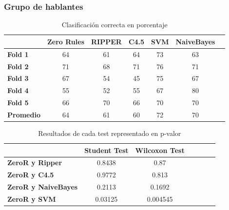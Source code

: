 \documentclass[mathserif]{beamer}%
\begin{document}
\begin{frame}
	\frametitle{Grupo de hablantes}
	
	\begin{table}[H]
		\centering
		\resizebox{9cm}{!} {
		\begin{tabular}{|l|c|c|c|c|c|c|}
			\hline
			\textbf{}  & \textbf{Zero Rules} & \textbf{RIPPER} & \textbf{C4.5} & \textbf{SVM} & \textbf{NaiveBayes} \\ \hline
			\textbf{Fold 1}  & 64 & 61 & 64 & 73 & 63 \\ \hline
			\textbf{Fold 2}  & 71 & 68 & 71 & 76 & 71 \\ \hline
			\textbf{Fold 3}  & 67 & 54 & 45 & 75 & 67 \\ \hline
			\textbf{Fold 4}  & 55 & 52 & 55 & 67 & 80 \\ \hline
			\textbf{Fold 5}  & 66 & 70 & 66 & 70 & 70 \\ \hline
			\hline \hline
			\textbf{Promedio} & 64 & 61 & 60 & 72 & 70 \\ \hline
		\end{tabular}
		}
		\caption{Clasificación correcta en porcentaje}
		\label{class_corr_en_pct}
	\end{table}
	
	\begin{table}[H]
		\centering
		\resizebox{9cm}{!} {
		\begin{tabular}{|l|c|c|c|c|c|c|}
			\hline
			\textbf{}  & \textbf{Student Test} & \textbf{Wilcoxon Test} \\ \hline
			\textbf{ZeroR y Ripper}  & 0.8438 & 0.87 \\ \hline
			\textbf{ZeroR y C4.5}  & 0.9772 & 0.813 \\ \hline
			\textbf{ZeroR y NaiveBayes}  & 0.2113 & 0.1692 \\ \hline
			\textbf{ZeroR y SVM}  & 0.03125 & 0.004545 \\ \hline
		\end{tabular}
		}
		\caption{Resultados de cada test representado en p-valor}
		\label{res_tests_wilcoxon_student}
	\end{table}
\end{frame}
\end{document}
